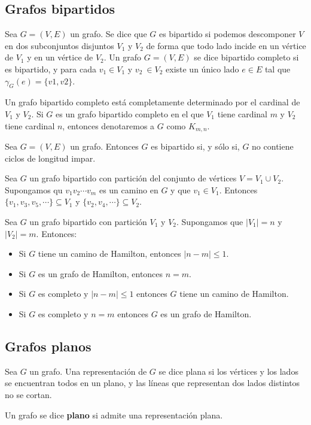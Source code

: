 \subsection{Grafos bipartidos}
\begin{ndef}
    Sea $G= (V, E)$ un grafo. Se dice que $G$ es bipartido si podemos descomponer $V$ en dos subconjuntos disjuntos $V_1$ y $V_2$ de forma que todo lado incide en un vértice de $V_1$ y en un vértice de $V_2$. Un grafo $G= (V, E)$ se dice bipartido completo si es bipartido, y para cada $v_1 \in V_1$ y $v_2\ \in V_2$ existe un único lado $e \in E$ tal que $\gamma_G(e) =\{v1, v2\}$.
\end{ndef}
Un grafo bipartido completo está completamente determinado por el cardinal de $V_1$ y $V_2$. Si $G$ es un grafo bipartido completo en el que $V_1$ tiene cardinal $m$ y $V_2$ tiene cardinal $n$, entonces denotaremos a $G$ como $K_{m,n}$.
\begin{nth}
    Sea $G= (V, E)$ un grafo. Entonces $G$ es bipartido si, y sólo si, $G$ no contiene ciclos de longitud impar.
\end{nth}
\begin{lema}
    Sea $G$ un grafo bipartido con partición del conjunto de vértices $V = V_1 \cup V_2$. Supongamos qu $v_1v_2\cdots v_m$ es un camino en $G$ y que $v_1 \in V_1$. Entonces $\{v_1,v_3,v_5,\cdots\} \subseteq V_1$ y $\{v_2,v_4,\cdots\} \subseteq V_2$.
\end{lema}
\begin{nprop}
    Sea $G$ un grafo bipartido con partición $V_1$ y $V_2$. Supongamos que $|V_1|=n$ y $|V_2|=m$. Entonces:
    \begin{itemize}
        \item Si $G$ tiene un camino de Hamilton, entonces $|n-m| \leq 1$.
        \item Si $G$ es un grafo de Hamilton, entonces $n=m$.
        \item Si $G$ es completo y $|n-m|\leq 1$ entonces $G$ tiene un camino de Hamilton.
        \item Si $G$ es completo y $n=m$ entonces $G$ es un grafo de Hamilton.
    \end{itemize}
\end{nprop}

\subsection{Grafos planos}
\begin{ndef}
    Sea $G$ un grafo. Una representación de $G$ se dice plana si los vértices y los lados se encuentran todos en un plano, y las líneas que representan dos lados distintos no se cortan.
\end{ndef}
Un grafo se dice \textbf{plano} si admite una representación plana.

